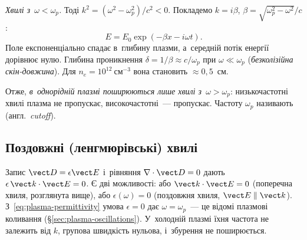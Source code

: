 \emph{Хвилі з~$\omega<\omega_p$.} Тоді $k^2=(\omega^2-\omega_p^2)/c^2<0$. Покладемо
$k=i\beta$, $\beta=\sqrt{\omega_p^2-\omega^2}/c$:
\begin{equation*}
	E=E_0\exp(-\beta x-i\omega t).
\end{equation*}
Поле експоненціально спадає в~глибину плазми, а~середній потік енергії дорівнює нулю.
Глибина проникнення $\delta=1/\beta\approx c/\omega_p$ при $\omega\ll\omega_p$
(\emph{безколізійна скін-довжина}). Для $n_e=10^{12}~\mathrm{см}^{-3}$ вона становить
$\approx0{,}5$~см.

Отже, \emph{в~однорідній плазмі поширюються лише хвилі з~$\omega>\omega_p$}:
низькочастотні хвилі плазма не пропускає, високочастотні~--- пропускає. Частоту $\omega_p$
називають  (англ.~\emph{cutoff}).



\subsection*{Поздовжні (ленгмюрівські) хвилі}\label{sec:langmuir-waves}



Запис $\vect D=\epsilon\vect E$ і~рівняння $\nabla\cdot\vect D=0$ дають
$\epsilon\,\vect k\cdot\vect E=0$. Є дві можливості: або $\vect k\cdot\vect E=0$
(поперечна хвиля, розглянута вище), або $\epsilon(\omega)=0$ (поздовжня хвиля, $\vect
	E\parallel\vect k$). З~\eqref{eq:plasma-permittivity} умова $\epsilon=0$ дає
$\omega=\omega_p$~--- це відомі плазмові коливання (§\ref{sec:plasma-oscillations}).
У~холодній плазмі їхня частота не залежить від $k$, групова швидкість нульова, і~збурення
не поширюється.

